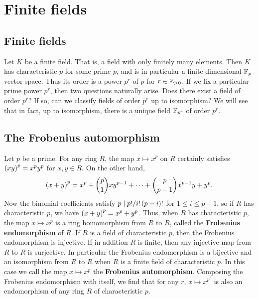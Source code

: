 \pagebreak

\section{Finite fields}

\subsection{Finite fields}


Let $ K $ be a finite field. That is, a field with only finitely many elements. Then $ K $ has characteristic $ p $ for some prime $ p $, and is in particular a finite dimensional $ \mathbb{F}_p $-vector space. Thus its order is a power $ p^r $ of $ p $ for $ r \in \mathbb{Z}_{> 0} $. If we fix a particular prime power $ p^r $, then two questions naturally arise. Does there exist a field of order $ p^r $? If so, can we classify fields of order $ p^r $ up to isomorphism? We will see that in fact, up to isomorphism, there is a unique field $ \mathbb{F}_{p^r} $ of order $ p^r $.

\subsection{The Frobenius automorphism}

Let $ p $ be a prime. For any ring $ R $, the map $ x \mapsto x^p $ on $ R $ certainly satisfies $ \br{xy}^p = x^py^p $ for $ x, y \in R $. On the other hand,
$$ \br{x + y}^p = x^p + \binom{p}{1}xy^{p - 1} + \dots + \binom{p}{p - 1}x^{p - 1}y + y^p. $$
Now the binomial coefficients satisfy $ p \mid p! / i!\br{p - i}! $ for $ 1 \le i \le p - 1 $, so if $ R $ has characteristic $ p $, we have $ \br{x + y}^p = x^p + y^p $. Thus, when $ R $ has characteristic $ p $, the map $ x \mapsto x^p $ is a ring homomorphism from $ R $ to $ R $, called the \textbf{Frobenius endomorphism} of $ R $. If $ R $ is a field of characteristic $ p $, then the Frobenius endomorphism is injective. If in addition $ R $ is finite, then any injective map from $ R $ to $ R $ is surjective. In particular the Frobenius endomorphism is a bijective and an isomorphism from $ R $ to $ R $ when $ R $ is a finite field of characteristic $ p $. In this case we call the map $ x \mapsto x^p $ the \textbf{Frobenius automorphism}. Composing the Frobenius endomorphism with itself, we find that for any $ r $, $ x \mapsto x^{p^r} $ is also an endomorphism of any ring $ R $ of characteristic $ p $.

